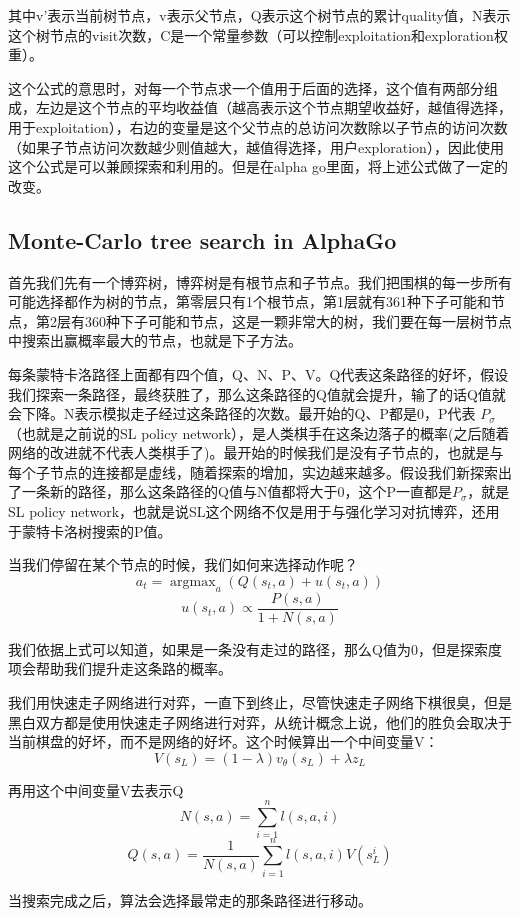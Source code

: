 \documentclass[12pt]{article}
\begin{document}
其中v'表示当前树节点，v表示父节点，Q表示这个树节点的累计quality值，N表示这个树节点的visit次数，C是一个常量参数（可以控制exploitation和exploration权重）。

这个公式的意思时，对每一个节点求一个值用于后面的选择，这个值有两部分组成，左边是这个节点的平均收益值（越高表示这个节点期望收益好，越值得选择，用于exploitation），右边的变量是这个父节点的总访问次数除以子节点的访问次数（如果子节点访问次数越少则值越大，越值得选择，用户exploration），因此使用这个公式是可以兼顾探索和利用的。但是在alpha go里面，将上述公式做了一定的改变。

\subsection{Monte-Carlo tree search in AlphaGo}
首先我们先有一个博弈树，博弈树是有根节点和子节点。我们把围棋的每一步所有可能选择都作为树的节点，第零层只有1个根节点，第1层就有361种下子可能和节点，第2层有360种下子可能和节点，这是一颗非常大的树，我们要在每一层树节点中搜索出赢概率最大的节点，也就是下子方法。

每条蒙特卡洛路径上面都有四个值，Q、N、P、V。Q代表这条路径的好坏，假设我们探索一条路径，最终获胜了，那么这条路径的Q值就会提升，输了的话Q值就会下降。N表示模拟走子经过这条路径的次数。最开始的Q、P都是0，P代表 $P_{\sigma}$（也就是之前说的SL policy network），是人类棋手在这条边落子的概率(之后随着网络的改进就不代表人类棋手了)。最开始的时候我们是没有子节点的，也就是与每个子节点的连接都是虚线，随着探索的增加，实边越来越多。假设我们新探索出了一条新的路径，那么这条路径的Q值与N值都将大于0，这个P一直都是$P_{\sigma}$，就是SL policy network，也就是说SL这个网络不仅是用于与强化学习对抗博弈，还用于蒙特卡洛树搜索的P值。

当我们停留在某个节点的时候，我们如何来选择动作呢？
$$
a_t = \mathop{\arg\max}_a(Q(s_t,a)+u(s_t,a))
$$
$$
u(s_t,a) \propto \frac{P(s,a)}{1+N(s,a)}
$$

我们依据上式可以知道，如果是一条没有走过的路径，那么Q值为0，但是探索度项会帮助我们提升走这条路的概率。

我们用快速走子网络进行对弈，一直下到终止，尽管快速走子网络下棋很臭，但是黑白双方都是使用快速走子网络进行对弈，从统计概念上说，他们的胜负会取决于当前棋盘的好坏，而不是网络的好坏。这个时候算出一个中间变量V：
$$
V(s_L) = (1-\lambda)v_{\theta}(s_L) + \lambda z_L
$$

再用这个中间变量V去表示Q
$$
N(s,a) = \sum_{i=1}^nl(s,a,i)
$$
$$
Q(s,a) = \frac{1}{N(s,a)}\sum_{i=1}^{n}l(s,a,i)V(s_L^i)
$$

当搜索完成之后，算法会选择最常走的那条路径进行移动。




\end{document}
